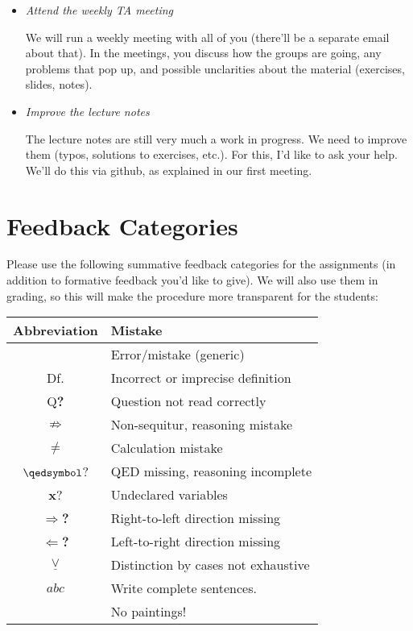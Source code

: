\begin{itemize}
		\item \emph{Attend the weekly TA meeting}
		
		We will run a weekly meeting with all of you (there'll be a separate email about that).
		In the meetings, you discuss how the groups are going, any problems that pop up, and possible unclarities about the material (exercises, slides, notes).



	  \item \emph{Improve the lecture notes}

		The lecture notes are still very much a work in progress.
		We need to improve them (typos, solutions to exercises, etc.).
		For this, I'd like to ask your help.
		We'll do this via github, as explained in our first meeting.

	\end{itemize}
	
\section*{Feedback Categories}

Please use the following summative feedback categories for the assignments (in addition to formative feedback you'd like to give). We will also use them in grading, so this will make the procedure more transparent for the students:
		\begin{longtable}{c | l}
		Abbreviation & Mistake \\
		\hline
		\lightning & Error/mistake (generic)\\
		Df. & Incorrect or imprecise definition \\
		Q\textbf{?} & Question not read correctly\\
		$\not\Rightarrow$ & Non-sequitur, reasoning mistake\\
		$\neq$ & Calculation mistake \\
		$\qedsymbol$? & QED missing, reasoning incomplete\\
		\textbf{x}? & Undeclared variables\\
		$\Rightarrow$\textbf{?} & Right-to-left direction missing \\
		$\Leftarrow$\textbf{?} & Left-to-right direction missing \\
		$\underline{\lor}$ & Distinction by cases not exhaustive\\
		$abc$ & Write complete sentences.\\
		 & No paintings!
		\end{longtable}

